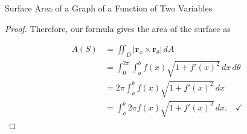 \documentclass[11pt,english,
handout
]{beamer}
\begin{document}
\begin{frame}[t]{Surface Area of a Graph of a Function of Two Variables}
\small
\begin{proof}
Therefore, our formula gives the area of the surface as

\begin{align*}
A(S)&=\iint_D|\mathbf{r}_x\times\mathbf{r}_\theta|\,dA\\[2mm]
&=\int_0^{2\pi}\int_a^bf(x)\sqrt{1+f'(x)^2}\,dx\,d\theta\\[2mm]
&=2\pi \int_a^bf(x)\sqrt{1+f'(x)^2}\,dx\\[2mm]
&=\int_a^b2\pi f(x)\sqrt{1+f'(x)^2}\,dx.\quad \checkmark
\end{align*}
\end{proof}
\end{frame}
\end{document}
